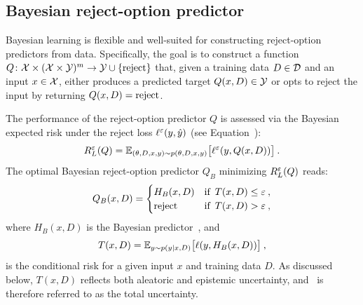 \subsection{Bayesian reject-option predictor}

Bayesian learning is flexible and well-suited for constructing reject-option predictors from data. Specifically, the goal is to construct a function $Q\colon{\cal X}\times({\cal X}\times{\cal Y})^m\rightarrow{\cal Y}\cup \{\rm reject\}$ that, given a training data $D\in{\cal D}$ and an input $x\in{\cal X}$, either produces a predicted target $Q(x,D)\in{\cal Y}$ or opts to reject the input by returning $Q(x,D)={\rm reject}$. 

The performance of the reject-option predictor $Q$ is assessed via the Bayesian expected risk under the reject loss $\ell^\varepsilon(y,\hat{y})$ (see Equation~):
\begin{multline}
\label{equ:BayesLearnRejectRisk}
R_L^\varepsilon(Q) = {\mathbb{E}}_{(\theta,D,x,y)\sim p(\theta,D,x,y)}\big [\ell^{\varepsilon}(y, Q(x, D)) \big ]\:.
\end{multline}
%
The optimal Bayesian reject-option predictor $Q_B$ minimizing $R_L^\varepsilon(Q)$ reads:
\begin{equation}
\label{equ:TotalRejectBL}
    Q_B(x,D)=\begin{cases}
       H_B(x,D) & \text{if }\, T(x,D) \leq \varepsilon \:,\\
       \text{reject}   & \text{if }\, T(x,D) > \varepsilon \:,\\
    \end{cases}
\end{equation}
%
where $H_B(x,D)$ is the Bayesian predictor~, and 
\begin{equation}
\label{equ:TotalCondRisk}
    T(x,D) = {\mathbb{E}}_{y\sim p(y|x,D)}\big[\ell(y,H_B(x,D))\big ]\:,
\end{equation}
%
is the conditional risk for a given input $x$ and training data $D$. As discussed below, $T(x,D)$ reflects both aleatoric and epistemic uncertainty, and~ is therefore referred to as the total uncertainty.


%


